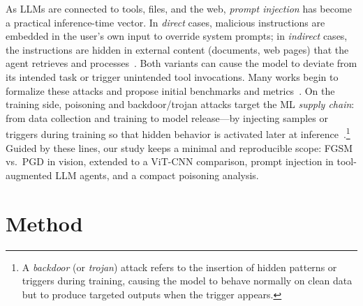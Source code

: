 \documentclass{article}
\begin{document}
As LLMs are connected to tools, files, and the web, \textit{prompt injection} has become a practical inference-time vector. In \textit{direct} cases, malicious instructions are embedded in the user's own input to override system prompts; in \textit{indirect} cases, the instructions are hidden in external content (documents, web pages) that the agent retrieves and processes~\cite{greshake2023youvesignedforcompromising}. Both variants can cause the model to deviate from its intended task or trigger unintended tool invocations. Many works begin to formalize these attacks and propose initial benchmarks and metrics~\cite{liu2024formalizingbenchmarkingpromptinjection}. On the training side, poisoning and backdoor/trojan attacks target the ML \textit{supply chain}: from data collection and training to model release—by injecting samples or triggers during training so that hidden behavior is activated later at inference~\cite{biggio2013poisoningattackssupportvector,shafahi2018poison,gu2019badnetsidentifyingvulnerabilitiesmachine,liu2018trojaning}.\footnote{%
  A \textit{backdoor} (or \textit{trojan}) attack refers to the insertion of hidden patterns or triggers during training, causing the model to behave normally on clean data but to produce targeted outputs when the trigger appears.} Guided by these lines, our study keeps a minimal and reproducible scope: FGSM vs.\ PGD in vision, extended to a ViT-CNN comparison, prompt injection in tool-augmented LLM agents, and a compact poisoning analysis.

\section{Method}\label{sec:method}
\end{document}
